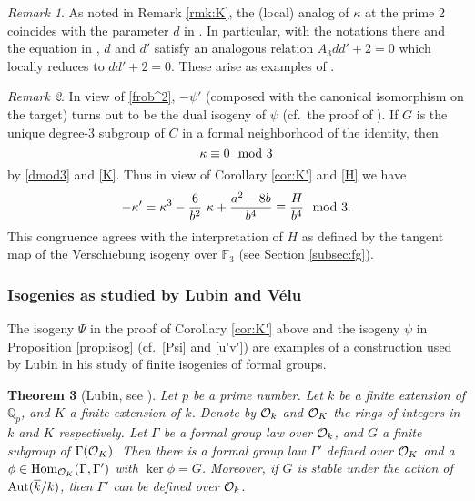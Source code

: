 \documentclass{gtpart}
\newtheorem{thm}{Theorem}
\theoremstyle{definition}
\theoremstyle{remark}
\newtheorem{rmk}[thm]{Remark}
\newcommand{\mb}[1]{\mathbb{#1}}
\newcommand{\Hom}{\ensuremath{{\rm Hom}}}
\newcommand{\Aut}{{\rm Aut}}
\newcommand{\ck}{\overline k}
\newcommand{\CO}{{\cal O}}
\newcommand{\BF}{{\mb F}}
\newcommand{\BQ}{{\mb Q}}
\newcommand{\md}{~~{\rm mod}~}
\newcommand{\G}{\Gamma}
\newcommand{\K}{\kappa}
\numberwithin{equation}{section}
\numberwithin{thm}{section}
\begin{document}
\begin{rmk}
 As noted in Remark \ref{rmk:K}, the (local) analog of $\K$ at the prime 
 2 coincides with the parameter $d$ in \cite[Section 3]{h2p2}.  In 
 particular, with the notations there and the equation in 
 \cite[Proposition 3.2]{tmf3}, $d$ and $d'$ satisfy an analogous 
 relation $A_3 d d' + 2 = 0$ which locally reduces to $d d' + 2 = 0$.  
 These arise as examples of \cite[Lemma 3.21]{poonen}.  
\end{rmk}

\begin{rmk}
 In view of \eqref{frob^2}, $-\psi'$ (composed with the canonical 
 isomorphism on the target) turns out to be the dual isogeny of $\psi$ 
 (cf.~the proof of \cite[2.9.4]{KM}).  If $G$ is the unique degree-3 
 subgroup of $C$ in a formal neighborhood of the identity, then 
 \begin{equation}
 \label{Kmod3}
  \K \equiv 0 \md 3 
 \end{equation}
 by \eqref{dmod3} and \eqref{K}.  Thus in view of Corollary 
 \ref{cor:K'} and \eqref{H} we have 
 \[
  -\K' = \K^3 - \frac{6}{b^2} ~ \K + \frac{a^2 - 8 b}{b^4} 
  \equiv \frac{H}{b^4} \md 3.  
 \]
 This congruence agrees with the interpretation of $H$ as defined by the 
 tangent map of the Verschiebung isogeny over $\BF_3$ (see Section 
 \ref{subsec:fg}).  
\end{rmk}

\subsubsection*{Isogenies as studied by Lubin and V\'elu}

The isogeny $\Psi$ in the proof of Corollary \ref{cor:K'} above and the 
isogeny $\psi$ in Proposition \ref{prop:isog} (cf.~\eqref{Psi} and 
\eqref{u'v'}) are examples of a construction used by Lubin in his study 
of finite isogenies of formal groups.  

\begin{thm}[Lubin, see {\cite[Theorem 1.4]{lubin}}]
\label{thm:lubin}
 Let $p$ be a prime number.  Let $k$ be a finite extension of $\BQ_p$, 
 and $K$ a finite extension of $k$.  Denote by $\CO_k$ and $\CO_K$ the 
 rings of integers in $k$ and $K$ respectively.  Let $\G$ be a formal 
 group law over $\CO_k$, and $G$ a finite subgroup of $\G(\CO_K)$.  Then 
 there is a formal group law $\G'$ defined over $\CO_K$ and a 
 $\phi \in \Hom_{\CO_K}(\G,\G')$ with $\ker \phi = G$.  Moreover, if $G$ 
 is stable under the action of $\Aut(\ck/k)$, then $\G'$ can be defined 
 over $\CO_k$.  
\end{thm}
\end{document}
